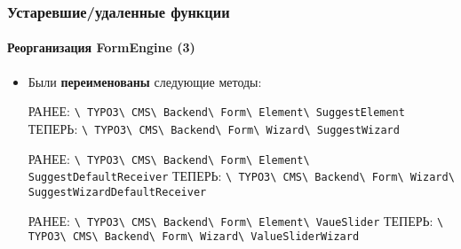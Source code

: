 \begin{frame}[fragile]
	\frametitle{Устаревшие/удаленные функции}
	\framesubtitle{Реорганизация FormEngine (3)}

	\begin{itemize}

		\item Были \textbf{переименованы} следующие методы:\newline

			\smaller
				РАНЕЕ:\tabto{1.4cm}
					\texttt{\textbackslash
						TYPO3\textbackslash
						CMS\textbackslash
						Backend\textbackslash
						Form\textbackslash
						Element\textbackslash
						SuggestElement}\newline
				ТЕПЕРЬ:\tabto{1.4cm}
					\texttt{\textbackslash
						TYPO3\textbackslash
						CMS\textbackslash
						Backend\textbackslash
						Form\textbackslash
						Wizard\textbackslash
						SuggestWizard}\newline

				РАНЕЕ:\tabto{1.4cm}
					\texttt{\textbackslash
						TYPO3\textbackslash
						CMS\textbackslash
						Backend\textbackslash
						Form\textbackslash
						Element\textbackslash
						SuggestDefaultReceiver}\newline
				ТЕПЕРЬ:\tabto{1.4cm}
					\texttt{\textbackslash
						TYPO3\textbackslash
						CMS\textbackslash
						Backend\textbackslash
						Form\textbackslash
						Wizard\textbackslash
						SuggestWizardDefaultReceiver}\newline

				РАНЕЕ:\tabto{1.4cm}
					\texttt{\textbackslash
						TYPO3\textbackslash
						CMS\textbackslash
						Backend\textbackslash
						Form\textbackslash
						Element\textbackslash
						VaueSlider}\newline
				ТЕПЕРЬ:\tabto{1.4cm}
					\texttt{\textbackslash
						TYPO3\textbackslash
						CMS\textbackslash
						Backend\textbackslash
						Form\textbackslash
						Wizard\textbackslash
						ValueSliderWizard}\newline

			\normalsize

	\end{itemize}

\end{frame}


